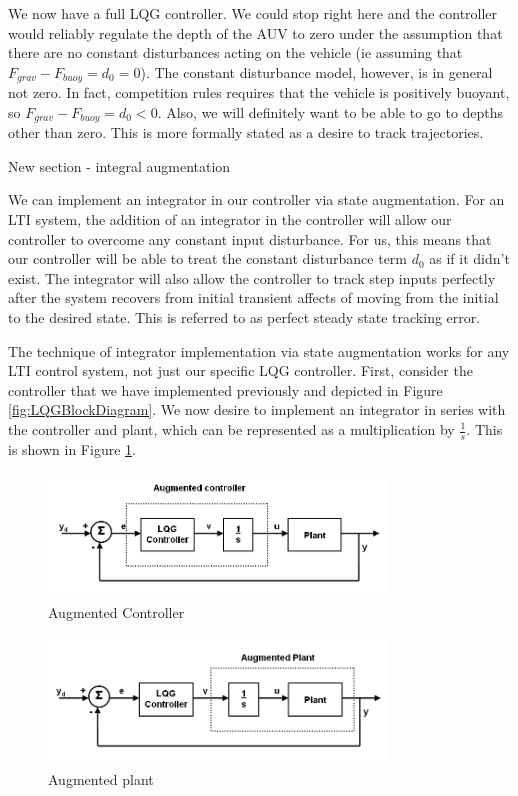 \documentclass{article}
\begin{document}
We now have a full LQG controller.  We could stop right here and the controller would reliably regulate the depth of the AUV to zero under the assumption that there are no constant disturbances acting on the vehicle (ie assuming that $F_{grav}-F_{buoy}=d_0=0$).  The constant disturbance model, however, is in general not zero.  In fact, competition rules requires that the vehicle is positively buoyant, so $F_{grav}-F_{buoy}=d_0<0$.  Also, we will definitely want to be able to go to depths other than zero.  This is more formally stated as a desire to track trajectories.  

New section - integral augmentation

We can implement an integrator in our controller via state augmentation.  For an LTI system, the addition of an integrator in the controller will allow our controller to overcome any constant input disturbance.  For us, this means that our controller will be able to treat the constant disturbance term $d_0$ as if it didn't exist.  The integrator will also allow the controller to track step inputs perfectly after the system recovers from initial transient affects of moving from the initial to the desired state.  This is referred to as perfect steady state tracking error.

The technique of integrator implementation via state augmentation works for any LTI control system, not just our specific LQG controller.  First, consider the controller that we have implemented previously and depicted in Figure \ref{fig:LQGBlockDiagram}.  We now desire to implement an integrator in series with the controller and plant, which can be represented as a multiplication by $\frac{1}{s}$.  This is shown in Figure \ref{fig:LQGAugmentedController}.  

\begin{figure}[h]
\includegraphics[width=0.8\textwidth]{LQGAugmentedController.PNG}
\centering
\caption{Augmented Controller}
\label{fig:LQGAugmentedController}
\end{figure}

\begin{figure}[h]
\includegraphics[width=0.8\textwidth]{LQGAugmentedPlant.PNG}
\centering
\caption{Augmented plant}
\label{fig:LQGAugmentedPlant}
\end{figure}
\end{document}
